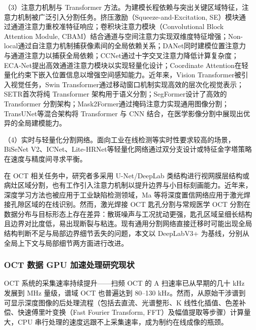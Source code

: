 （3）注意力机制与 Transformer 方法。为建模长程依赖与突出关键区域特征，注意力机制被广泛引入分割任务。挤压激励（Squeeze-and-Excitation, SE）模块通过通道注意力重校准特征响应；卷积块注意力模块（Convolutional Block Attention Module, CBAM）结合通道与空间注意力实现双维度特征增强；Non-local通过自注意力机制捕获像素间的全局依赖关系；DANet同时建模位置注意力与通道注意力以捕获全局依赖；CCNet通过十字交叉注意力降低计算复杂度；ECA-Net提出高效通道注意力模块以实现轻量化设计；Coordinate Attention在轻量化约束下嵌入位置信息以增强空间感知能力。近年来，Vision Transformer被引入视觉任务，Swin Transformer通过移动窗口机制实现高效的层次化视觉表示；SETR首次将纯 Transformer 架构用于语义分割；SegFormer设计了高效的 Transformer 分割架构；Mask2Former通过掩码注意力实现通用图像分割；TransUNet等混合架构将 Transformer 与 CNN 结合，在医学影像分割中展现出优异的全局建模能力。

（4）实时与轻量化分割网络。面向工业在线检测等实时性要求较高的场景，BiSeNet V2、ICNet、Lite-HRNet等轻量化网络通过双分支设计或特征金字塔策略在速度与精度间寻求平衡。

在 OCT 相关任务中，研究者多采用 U-Net/DeepLab 类结构进行视网膜层结构或病灶区域分割，也有工作引入注意力机制以提升边界与小目标刻画能力。近年来，深度学习方法也被应用于工业缺陷检测领域，Ma 等将深度置信网络应用于激光焊接孔隙区域的在线识别。然而，激光焊接 OCT 匙孔分割与常规医学 OCT 分割在数据分布与目标形态上存在差异：散斑噪声与工况扰动更强，匙孔区域呈细长结构且边界对比度低，易出现断裂与粘连。现有通用分割网络直接迁移时可能出现全局结构判断不足与局部边界细节丢失的问题，本文以 DeepLabV3+ 为基线，分别从全局上下文与局部细节两方面进行改进。

\subsubsection{OCT 数据 GPU 加速处理研究现状}

OCT 系统的采集速率持续提升——扫频 OCT 的 A 扫速率已从早期的几十 kHz 发展到 MHz 量级，谱域 OCT 也普遍达到 80--130 kHz。然而，从原始干涉谱到可显示深度图像的后处理流程（包括去直流、光谱整形、K 线性化插值、色差补偿、快速傅里叶变换（Fast Fourier Transform, FFT）及幅值提取等步骤）计算量大，CPU 串行处理的速度远跟不上采集速率，成为制约在线成像的瓶颈。

